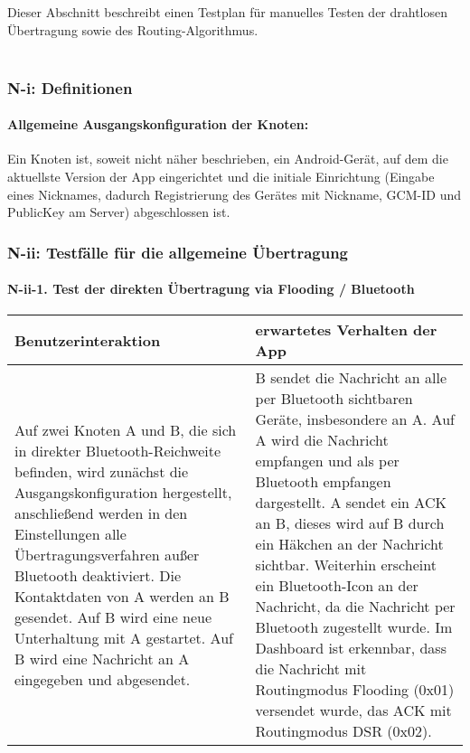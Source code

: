 
Dieser Abschnitt beschreibt einen Testplan für manuelles Testen der
drahtlosen Übertragung sowie des Routing-Algorithmus.\\\\


\subsubsection{N-i: Definitionen}\label{i-definitionen}

\paragraph{Allgemeine Ausgangskonfiguration der
Knoten:}\label{allgemeine-ausgangskonfiguration-der-knoten}

Ein Knoten ist, soweit nicht näher beschrieben, ein Android-Gerät, auf
dem die aktuellste Version der App eingerichtet und die initiale
Einrichtung (Eingabe eines Nicknames, dadurch Registrierung des Gerätes
mit Nickname, GCM-ID und PublicKey am Server) abgeschlossen ist.



\clearpage
\subsubsection{N-ii: Testfälle für die allgemeine
Übertragung}\label{ii-testfuxe4lle-fuxfcr-die-allgemeine-uxfcbertragung}

\paragraph{N-ii-1. Test der direkten Übertragung via Flooding /
Bluetooth}\label{test-der-direkten-uxfcbertragung-via-flooding-bluetooth}

\begin{longtable}{p{8cm}p{8.5cm}}
\toprule
Benutzerinteraktion & erwartetes Verhalten der App\tabularnewline
\midrule
\endhead
Auf zwei Knoten A und B, die sich in direkter Bluetooth-Reichweite
befinden, wird zunächst die Ausgangskonfiguration hergestellt,
anschließend werden in den Einstellungen alle Übertragungsverfahren
außer Bluetooth deaktiviert. Die Kontaktdaten von A werden an B
gesendet. Auf B wird eine neue Unterhaltung mit A gestartet. Auf B wird
eine Nachricht an A eingegeben und abgesendet. & B sendet die Nachricht
an alle per Bluetooth sichtbaren Geräte, insbesondere an A. Auf A wird
die Nachricht empfangen und als per Bluetooth empfangen dargestellt. A
sendet ein ACK an B, dieses wird auf B durch ein Häkchen an der
Nachricht sichtbar. Weiterhin erscheint ein Bluetooth-Icon an der
Nachricht, da die Nachricht per Bluetooth zugestellt wurde. Im Dashboard
ist erkennbar, dass die Nachricht mit Routingmodus Flooding (0x01)
versendet wurde, das ACK mit Routingmodus DSR (0x02).\tabularnewline
\bottomrule
\end{longtable}

